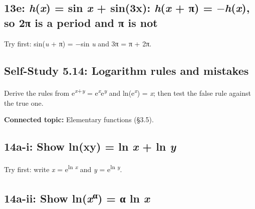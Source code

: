 \documentclass[11pt]{article}
\begin{document}
\begin{keepsection}
\begin{keepsection}
\subsection{13e: \textit{h}(\textit{x}) = sin \textit{x} + sin(3x): \textit{h}(\textit{x} + π) = \ensuremath{-}\textit{h}(\textit{x}), so 2π is a period and π is not}

Try first: sin(\textit{u} + π) = \ensuremath{-}sin \textit{u} and 3π = π + 2π.

\end{keepsection}
\end{keepsection}

\begin{keepsection}
\section{Self-Study 5.14: Logarithm rules and mistakes}

Derive the rules from e\textsuperscript{\textit{x}+\textit{y}} = e\textsuperscript{\textit{x}}e\textsuperscript{\textit{y}} and ln(e\textsuperscript{\textit{x}}) = \textit{x}; then test the false rule against the true one.

\textbf{Connected topic:} Elementary functions (§3.5).

\begin{keepsection}
\subsection{14a-i: Show ln(xy) = ln \textit{x} + ln \textit{y}}

Try first: write \textit{x} = e\textsuperscript{ln \textit{x}} and \textit{y} = e\textsuperscript{ln \textit{y}}.

\end{keepsection}

\begin{keepsection}
\subsection{14a-ii: Show ln(\textit{x}\textsuperscript{α}) = α ln \textit{x}}


\end{keepsection}
\end{keepsection}
\end{document}
